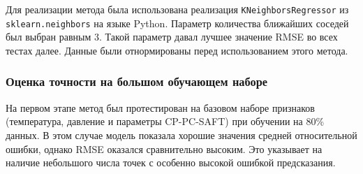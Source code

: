 \documentclass[a4paper,12pt]{article}
\begin{document}
    Для реализации метода была использована реализация \texttt{KNeighborsRegressor} из \texttt{sklearn.neighbors} на языке Python. Параметр количества ближайших соседей был выбран равным 3. Такой параметр давал лучшее значение RMSE во всех тестах далее. Данные были отнормированы перед использованием этого метода.

    \subsubsection{Оценка точности на большом обучающем наборе}

      На первом этапе метод был протестирован на базовом наборе признаков (температура, давление и параметры CP-PC-SAFT) при обучении на 80\% данных. В этом случае модель показала хорошие значения средней относительной ошибки, однако RMSE оказался сравнительно высоким. Это указывает на наличие небольшого числа точек с особенно высокой ошибкой предсказания.
      
\end{document}
